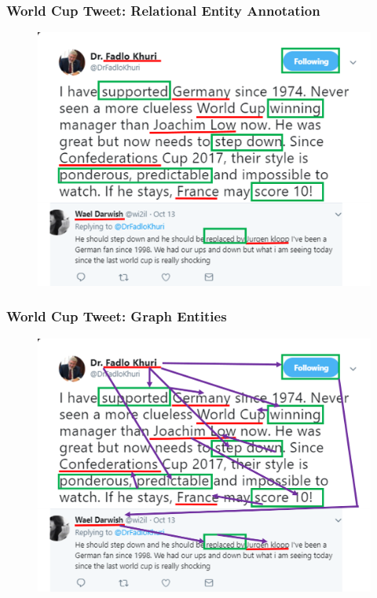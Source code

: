 \documentclass[xcolor=table]{beamer}
\newcommand{\itodo}[1]{\todo[inline]{#1}}
\begin{document}
\begin{frame}
\frametitle{World Cup Tweet: Relational Entity Annotation }
\begin{figure}[!htb]
   \centering
    \includegraphics[scale=0.5]{img0004_2.png}
    
\end{figure}
\end{frame}



\begin{frame}
\frametitle{World Cup Tweet: Graph Entities }
\begin{figure}[!htb]
   \centering
    \includegraphics[scale=0.5]{img0004_3.png}
    
\end{figure}
\end{frame}
\end{document}
